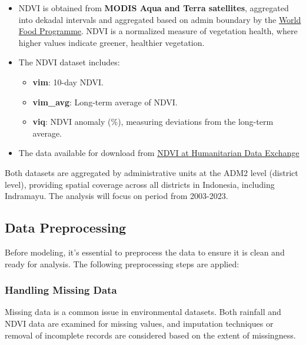 \documentclass[
]{article}
\providecommand{\tightlist}{%
  \setlength{\itemsep}{0pt}\setlength{\parskip}{0pt}}
\begin{document}
\begin{enumerate}
  \begin{itemize}
  \tightlist
  \item
    NDVI is obtained from \textbf{MODIS Aqua and Terra satellites},
    aggregated into dekadal intervals and aggregated based on admin
    boundary by the
    \href{https://dataviz.vam.wfp.org/climate-explorer/rainfall-and-vegetation?current_page=1}{World
    Food Programme}. NDVI is a normalized measure of vegetation health,
    where higher values indicate greener, healthier vegetation.
  \item
    The NDVI dataset includes:

    \begin{itemize}
    \tightlist
    \item
      \textbf{vim}: 10-day NDVI.
    \item
      \textbf{vim\_avg}: Long-term average of NDVI.
    \item
      \textbf{viq}: NDVI anomaly (\%), measuring deviations from the
      long-term average.
    \end{itemize}
  \item
    The data available for download from
    \href{https://data.humdata.org/dataset/?dataseries_name=WFP+-+NDVI+at+Subnational+Level}{NDVI
    at Humanitarian Data Exchange}
  \end{itemize}
\end{enumerate}

Both datasets are aggregated by administrative units at the ADM2 level
(district level), providing spatial coverage across all districts in
Indonesia, including Indramayu. The analysis will focus on period from
2003-2023.

\subsection{Data Preprocessing}\label{data-preprocessing}

Before modeling, it's essential to preprocess the data to ensure it is
clean and ready for analysis. The following preprocessing steps are
applied:

\subsubsection{Handling Missing Data}\label{handling-missing-data}

Missing data is a common issue in environmental datasets. Both rainfall
and NDVI data are examined for missing values, and imputation techniques
or removal of incomplete records are considered based on the extent of
missingness.
\end{document}
